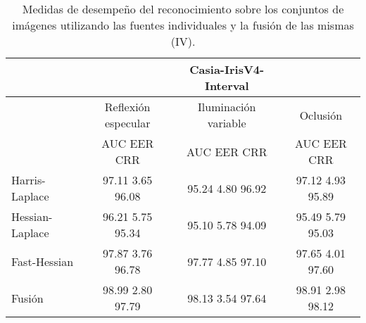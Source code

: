 \begin{table}[h]
\begin{center}
\begin{tabular}{@{}lccc@{}}
\toprule
&& Casia-IrisV4-Interval & \\ \hline
&Reflexión especular		&  	Iluminación variable		& Oclusión \\ \hline
&AUC  \phantom{aa} EER  \phantom{aa} CRR &  	AUC  \phantom{aa} EER  \phantom{aa} CRR		& AUC  \phantom{aa} EER  \phantom{aa} CRR \\ \hline
Harris-Laplace& 97.11 \phantom{aa} 3.65  \phantom{aa} 96.08 &  	95.24 \phantom{aa} 4.80  \phantom{aa}96.92		& 97.12 \phantom{aa} 4.93 \phantom{aa} 95.89 \\
Hessian-Laplace& 96.21 \phantom{aa} 5.75 \phantom{aa} 95.34 &  	95.10 \phantom{aa} 5.78 \phantom{aa} 94.09 & 95.49 \phantom{aa} 5.79 \phantom{aa} 95.03 \\
Fast-Hessian& 97.87  \phantom{aa}3.76 \phantom{aa}  96.78 &  	97.77 \phantom{aa} 4.85  \phantom{aa}97.10		& 97.65  \phantom{aa}4.01 \phantom{aa} 97.60 \\
Fusión& 98.99 \phantom{aa} 2.80  \phantom{aa}97.79 &  	98.13  \phantom{aa}3.54 \phantom{aa} 97.64		& 98.91 \phantom{aa} 2.98 \phantom{aa}98.12 \\   \hline

\end{tabular}
\end{center}
\caption{Medidas de desempeño del reconocimiento sobre los conjuntos de imágenes utilizando las fuentes individuales y la fusión de las mismas (IV).}
\label{my_tabla}
\end{table}


